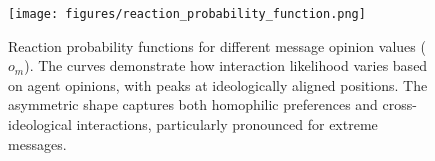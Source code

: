 \begin{figure}[htbp]
    \centering
    \texttt{[image: figures/reaction\_probability\_function.png]}
    \caption{Reaction probability functions for different message opinion values ($o_m$). The curves demonstrate how interaction likelihood varies based on agent opinions, with peaks at ideologically aligned positions. The asymmetric shape captures both homophilic preferences and cross-ideological interactions, particularly pronounced for extreme messages.}
    \label{fig:reaction-function}
\end{figure}
